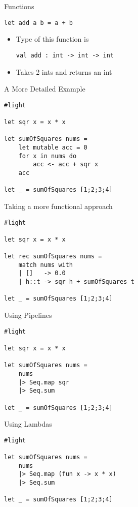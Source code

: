\documentclass[landscape]{slides}
\begin{document}
\begin{slide}{Functions}
\begin{verbatim}
let add a b = a + b
\end{verbatim}
\begin{itemize}
\item Type of this function is
\begin{verbatim}
val add : int -> int -> int
\end{verbatim}
\item Takes 2 ints and returns an int
\end{itemize}
\end{slide}

\begin{slide}{A More Detailed Example}
\begin{verbatim}
#light

let sqr x = x * x

let sumOfSquares nums =
    let mutable acc = 0
    for x in nums do
        acc <- acc + sqr x
    acc

let _ = sumOfSquares [1;2;3;4]
\end{verbatim}
\end{slide}

\begin{slide}{Taking a more functional approach}
\begin{verbatim}
#light

let sqr x = x * x

let rec sumOfSquares nums =
    match nums with
    | []   -> 0.0
    | h::t -> sqr h + sumOfSquares t

let _ = sumOfSquares [1;2;3;4]
\end{verbatim}
\end{slide}

\begin{slide}{Using Pipelines}
\begin{verbatim}
#light

let sqr x = x * x

let sumOfSquares nums =
    nums 
    |> Seq.map sqr
    |> Seq.sum

let _ = sumOfSquares [1;2;3;4]
\end{verbatim}
\end{slide}

\begin{slide}{Using Lambdas}
\begin{verbatim}
#light

let sumOfSquares nums =
    nums 
    |> Seq.map (fun x -> x * x) 
    |> Seq.sum

let _ = sumOfSquares [1;2;3;4]
\end{verbatim}
\end{slide}
\end{document}
